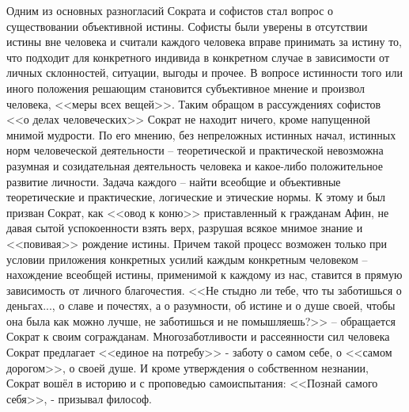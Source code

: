 Одним из основных разногласий Сократа и софистов стал вопрос о существовании объективной истины. Софисты были 
уверены в отсутствии истины вне человека и считали каждого человека вправе принимать за истину то, что 
подходит для конкретного индивида в конкретном случае в зависимости от личных склонностей, ситуации, выгоды и 
прочее. В вопросе истинности того или иного положения решающим становится субъективное мнение и произвол 
человека, <<меры всех вещей>>. Таким обращом в рассуждениях софистов <<о делах человеческих>> Сократ не 
находит ничего, кроме напущенной мнимой мудрости. По его мнению, без непреложных истинных начал, истинных 
норм человеческой деятельности -- теоретической и практической невозможна разумная и созидательная 
деятельность человека и какое-либо положительное развитие личности. Задача каждого -- найти всеобщие и 
объективные теоретические и практические, логические и этические нормы. К этому и был призван Сократ, как 
<<овод к коню>> приставленный к гражданам Афин, не давая сытой успокоенности взять верх, разрушая всякое 
мнимое знание и <<повивая>> рождение истины. Причем такой процесс возможен только при условии приложения 
конкретных усилий каждым конкретным человеком -- нахождение всеобщей истины, применимой к каждому из нас, 
ставится в прямую зависимость от личного благочестия. <<Не стыдно ли тебе, что ты заботишься о деньгах..., о 
славе и почестях, а о разумности, об истине и о душе своей, чтобы она была как можно лучше, не заботишься и 
не помышляешь?>> -- обращается Сократ к своим согражданам. Многозаботливости и рассеянности сил человека 
Сократ предлагает <<единое на потребу>> - заботу о самом себе, о <<самом дорогом>>, о своей душе. И кроме 
утверждения о собственном незнании, Сократ вошёл в историю и с проповедью самоиспытания: <<Познай самого 
себя>>, - призывал философ.